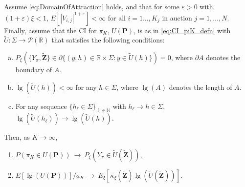 \begin{theorem}\label{thm:CI_pi_K} 
Assume \eqref{eq:DomainOfAttraction} holds, and that for some $\varepsilon >0$ with $(1+\varepsilon)\xi<1$, $E[|V_{i,j}|^{1+\varepsilon}]<\infty $ for all $i=1\dots,K_j$ in auction $j=1,\dots,N$. Finally, assume that the CI for $\pi _{K}$, $U(\mathbf{P})$, is as in \eqref{eq:CI_piK_defn} with $\tilde{U}:\Sigma\to \mathcal{P}(\mathbb{R}) $ that satisfies the following conditions:
\begin{enumerate}[(a)]
\item $P_{\xi}(\{Y_{\pi},\mathbf{\tilde{Z}}\}\in \partial \{(y,h)\in \mathbb{R} \times \Sigma:y\in \tilde{U}(h)\})=0$, where $\partial A$ denotes the boundary of $A$.
\item $\lg (\tilde{U}(h))<\infty $ for any $h\in \Sigma$, where $\lg (A)$ denotes the length of $A$.
\item For any sequence $\{h_{\ell}\in \Sigma\}_{\ell\in \mathbb{N}}$ with $ h_{\ell}\to h\in \Sigma$, $\lg (\tilde{U} (h_{\ell}))\to \lg (\tilde{U}(h))$.
\end{enumerate}
Then, as $K\to \infty $,
\begin{enumerate}
\item $P(\pi _{K}\in U(\mathbf{P}))~\to ~P_{\xi }(Y_{\pi }\in \tilde{ U}(\mathbf{\tilde{Z}}))$,
\item $E[\lg (U(\mathbf{P}))]/a_{K}~\to ~E_{\xi }[\kappa _{\xi }( \mathbf{\tilde{Z}})\lg (\tilde{U}(\mathbf{\tilde{Z}}))]$.
\end{enumerate}
\end{theorem}
